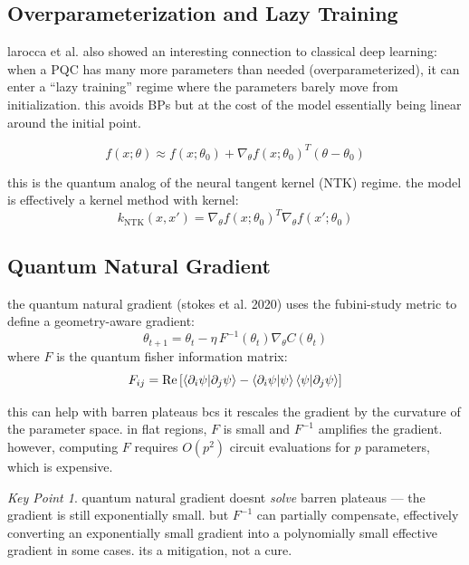 \documentclass[11pt,a4paper]{article}
\theoremstyle{definition}
\theoremstyle{remark}
\newtheorem*{keypoint}{Key Point}
\begin{document}
\subsection{Overparameterization and Lazy Training}

larocca et al. also showed an interesting connection to classical deep learning: when a PQC has many more parameters than needed (overparameterized), it can enter a ``lazy training'' regime where the parameters barely move from initialization. this avoids BPs but at the cost of the model essentially being linear around the initial point.

\begin{equation}
    f(x; \theta) \approx f(x; \theta_0) + \nabla_\theta f(x; \theta_0)^T (\theta - \theta_0)
\end{equation}

this is the quantum analog of the neural tangent kernel (NTK) regime. the model is effectively a kernel method with kernel:
\begin{equation}
    k_{\text{NTK}}(x, x') = \nabla_\theta f(x; \theta_0)^T \nabla_\theta f(x'; \theta_0)
\end{equation}

\subsection{Quantum Natural Gradient}

the quantum natural gradient (stokes et al. 2020) uses the fubini-study metric to define a geometry-aware gradient:
\begin{equation}
    \theta_{t+1} = \theta_t - \eta \, F^{-1}(\theta_t) \nabla_\theta C(\theta_t)
\end{equation}
where $F$ is the quantum fisher information matrix:
\begin{equation}
    F_{ij} = \text{Re}\left[\braket{\partial_i \psi | \partial_j \psi} - \braket{\partial_i \psi | \psi}\braket{\psi | \partial_j \psi}\right]
\end{equation}

this can help with barren plateaus bcs it rescales the gradient by the curvature of the parameter space. in flat regions, $F$ is small and $F^{-1}$ amplifies the gradient. however, computing $F$ requires $O(p^2)$ circuit evaluations for $p$ parameters, which is expensive.

\begin{keypoint}
quantum natural gradient doesnt \emph{solve} barren plateaus --- the gradient is still exponentially small. but $F^{-1}$ can partially compensate, effectively converting an exponentially small gradient into a polynomially small effective gradient in some cases. its a mitigation, not a cure.
\end{keypoint}
\end{document}
